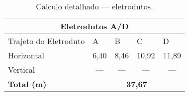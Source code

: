 \begin{table}[H]
\caption{Calculo detalhado --- eletrodutos.}
\label{tab7}
\begin{center}
	\renewcommand{\arraystretch}{1.2}
\begin{tabular}{|l|c|c|c|c|}
	\hline
	\multicolumn{5}{|c|}{\textbf{Eletrodutos A/D}}                                                                            \\ \hline
	Trajeto do Eletroduto & \multicolumn{1}{l|}{A} & \multicolumn{1}{l|}{B} & \multicolumn{1}{l|}{C} & \multicolumn{1}{l|}{D} \\ \hline
	Horizontal            & 6,40                   & 8,46                  & 10,92                  & 11,89                   \\ \hline
	Vertical              & ---                    & ---                    & ---                    & ---                    \\ \hline
	\textbf{Total (m)}    & \multicolumn{4}{c|}{\textbf{37,67}}                                                               \\ \hline
\end{tabular}
\end{center}
\end{table}
